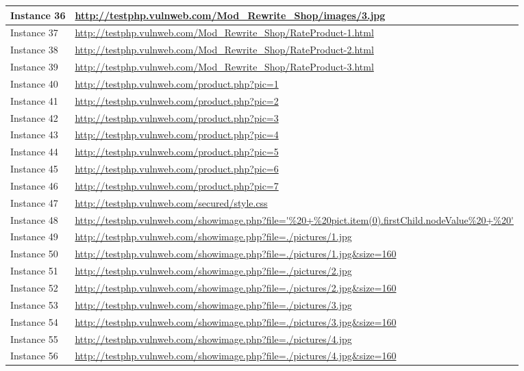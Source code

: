 \documentclass[12pt]{article}
\begin{document}
\begin{center}
\begin{longtable}{|l|p{10cm}|}
\hline
Instance 36 & \url{http://testphp.vulnweb.com/Mod\_Rewrite\_Shop/images/3.jpg} \\
\hline
Instance 37 & \url{http://testphp.vulnweb.com/Mod\_Rewrite\_Shop/RateProduct-1.html} \\
\hline
Instance 38 & \url{http://testphp.vulnweb.com/Mod\_Rewrite\_Shop/RateProduct-2.html} \\
\hline
Instance 39 & \url{http://testphp.vulnweb.com/Mod\_Rewrite\_Shop/RateProduct-3.html} \\
\hline
Instance 40 & \url{http://testphp.vulnweb.com/product.php?pic=1} \\
\hline
Instance 41 & \url{http://testphp.vulnweb.com/product.php?pic=2} \\
\hline
Instance 42 & \url{http://testphp.vulnweb.com/product.php?pic=3} \\
\hline
Instance 43 & \url{http://testphp.vulnweb.com/product.php?pic=4} \\
\hline
Instance 44 & \url{http://testphp.vulnweb.com/product.php?pic=5} \\
\hline
Instance 45 & \url{http://testphp.vulnweb.com/product.php?pic=6} \\
\hline
Instance 46 & \url{http://testphp.vulnweb.com/product.php?pic=7} \\
\hline
Instance 47 & \url{http://testphp.vulnweb.com/secured/style.css} \\
\hline
Instance 48 & \url{http://testphp.vulnweb.com/showimage.php?file='\%20+\%20pict.item(0).firstChild.nodeValue\%20+\%20'} \\
\hline
Instance 49 & \url{http://testphp.vulnweb.com/showimage.php?file=./pictures/1.jpg} \\
\hline
Instance 50 & \url{http://testphp.vulnweb.com/showimage.php?file=./pictures/1.jpg\&size=160} \\
\hline
Instance 51 & \url{http://testphp.vulnweb.com/showimage.php?file=./pictures/2.jpg} \\
\hline
Instance 52 & \url{http://testphp.vulnweb.com/showimage.php?file=./pictures/2.jpg\&size=160} \\
\hline
Instance 53 & \url{http://testphp.vulnweb.com/showimage.php?file=./pictures/3.jpg} \\
\hline
Instance 54 & \url{http://testphp.vulnweb.com/showimage.php?file=./pictures/3.jpg\&size=160} \\
\hline
Instance 55 & \url{http://testphp.vulnweb.com/showimage.php?file=./pictures/4.jpg} \\
\hline
Instance 56 & \url{http://testphp.vulnweb.com/showimage.php?file=./pictures/4.jpg\&size=160} \\

\end{longtable}
\end{center}
\end{document}
